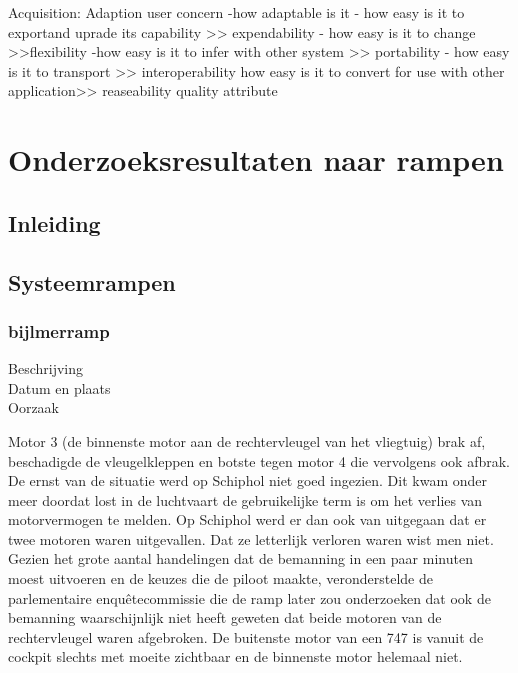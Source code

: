 Acquisition: Adaption
user concern
-how adaptable is it
- how easy is it to exportand uprade its capability >> expendability
- how easy is it to change >>flexibility
-how easy is it to infer with other system >> portability
- how easy is it to transport >> interoperability
how easy is it to convert for use with other application>> reaseability
quality attribute




\section{Onderzoeksresultaten naar rampen}

\subsection{Inleiding}

\subsection{Systeemrampen}
\subsubsection{bijlmerramp}

	\begin{description}
	\item[Beschrijving]
	\item[Datum en plaats] 
	\item[Oorzaak]
\end{description}
Motor 3 (de binnenste motor aan de rechtervleugel van het vliegtuig) brak af, beschadigde de vleugelkleppen en botste tegen motor 4 die vervolgens ook afbrak.
De ernst van de situatie werd op Schiphol niet goed ingezien. Dit kwam onder meer doordat lost in de luchtvaart de gebruikelijke term is om het verlies van motorvermogen te melden. Op Schiphol werd er dan ook van uitgegaan dat er twee motoren waren uitgevallen. Dat ze letterlijk verloren waren wist men niet. Gezien het grote aantal handelingen dat de bemanning in een paar minuten moest uitvoeren en de keuzes die de piloot maakte, veronderstelde de parlementaire enquêtecommissie die de ramp later zou onderzoeken dat ook de bemanning waarschijnlijk niet heeft geweten dat beide motoren van de rechtervleugel waren afgebroken. De buitenste motor van een 747 is vanuit de cockpit slechts met moeite zichtbaar en de binnenste motor helemaal niet.

